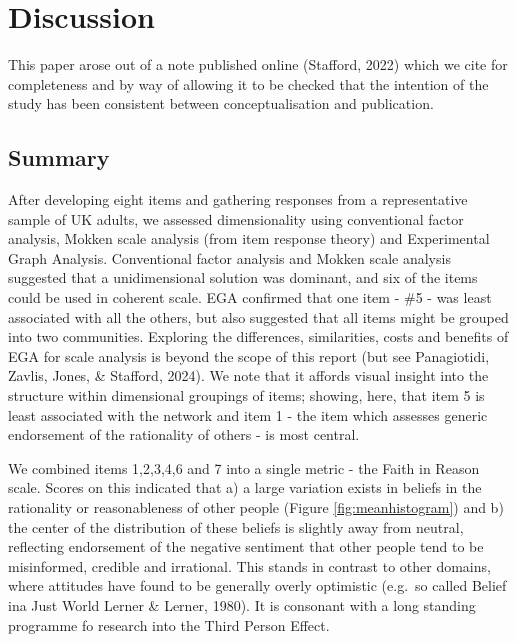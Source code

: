 \documentclass[
  ,jou,floatsintext]{apa6}
\begin{document}
\hypertarget{discussion}{%
\section{Discussion}\label{discussion}}

This paper arose out of a note published online (Stafford, 2022) which we cite for completeness and by way of allowing it to be checked that the intention of the study has been consistent between conceptualisation and publication.

\hypertarget{summary-1}{%
\subsection{Summary}\label{summary-1}}

After developing eight items and gathering responses from a representative sample of UK adults, we assessed dimensionality using conventional factor analysis, Mokken scale analysis (from item response theory) and Experimental Graph Analysis. Conventional factor analysis and Mokken scale analysis suggested that a unidimensional solution was dominant, and six of the items could be used in coherent scale. EGA confirmed that one item - \#5 - was least associated with all the others, but also suggested that all items might be grouped into two communities. Exploring the differences, similarities, costs and benefits of EGA for scale analysis is beyond the scope of this report (but see Panagiotidi, Zavlis, Jones, \& Stafford, 2024). We note that it affords visual insight into the structure within dimensional groupings of items; showing, here, that item 5 is least associated with the network and item 1 - the item which assesses generic endorsement of the rationality of others - is most central.

We combined items 1,2,3,4,6 and 7 into a single metric - the Faith in Reason scale. Scores on this indicated that a) a large variation exists in beliefs in the rationality or reasonableness of other people (Figure \ref{fig:meanhistogram}) and b) the center of the distribution of these beliefs is slightly away from neutral, reflecting endorsement of the negative sentiment that other people tend to be misinformed, credible and irrational. This stands in contrast to other domains, where attitudes have found to be generally overly optimistic (e.g.~so called Belief ina Just World Lerner \& Lerner, 1980). It is consonant with a long standing programme fo research into the Third Person Effect.
\end{document}
